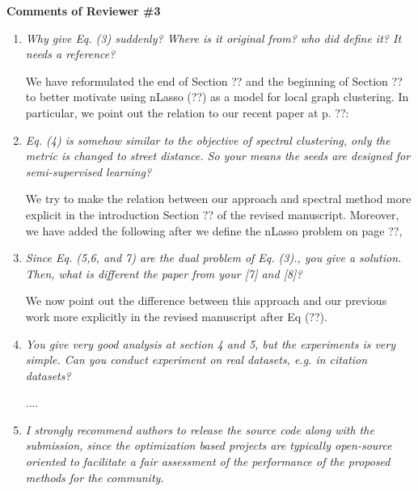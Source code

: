 \documentclass[11pt,onecolumn]{IEEEtran}
\begin{document}
\begin{center}
{\bf\large Comments of Reviewer \#3}
\vspace{1mm}
\end{center}
\begin{enumerate}

\item[3.1] {\em Why give Eq. (3) suddenly? Where is it original from? who did define it? It needs a reference?}

\vspace*{2mm}
We have reformulated the end of Section ?? and the beginning of Section ?? to better motivate 
using nLasso (??) as a model for local graph clustering. In particular, we point out the relation to 
our recent paper at p. ??: 

\vspace*{3mm} 

\item[3.2] {\em Eq. (4) is somehow similar to the objective of spectral clustering, only the metric is changed
to street distance. So your means the seeds are designed for semi-supervised learning?}

\vspace*{2mm}
We try to make the relation between our approach and spectral method more explicit in the introduction Section ?? 
of the revised manuscript. Moreover, we have added the following after we define the nLasso problem on page ??, 
\vspace*{3mm} 

\item[3.3] {\em Since Eq. (5,6, and 7) are the dual problem of Eq. (3)., you give a solution. Then, what is
different the paper from your [7] and [8]? }

\vspace*{2mm}
We now point out the difference between this approach and our previous work more explicitly in the 
revised manuscript after Eq (??). 
\vspace*{3mm} 

\item[3.4] {\em You give very good analysis at section 4 and 5, but the experiments is very simple. 
	Can you conduct experiment on real datasets, e.g. in citation datasets? }

\vspace*{2mm}
....
\vspace*{3mm} 

\item[3.5] {\em  I strongly recommend authors to release the source code along with the submission, since
the optimization based projects are typically open-source oriented to facilitate a fair assessment
of the performance of the proposed methods for the community. }


\end{enumerate}
\end{document}
